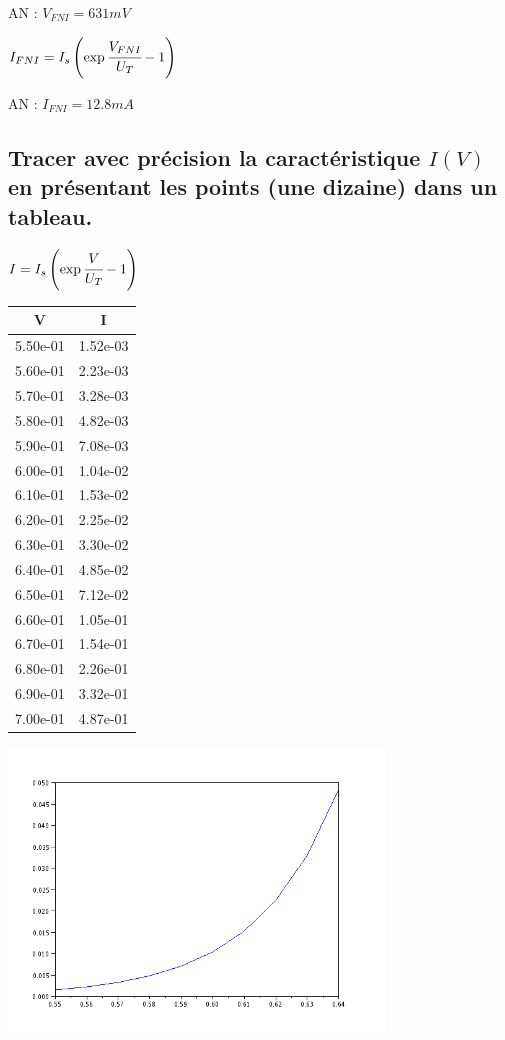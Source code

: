 \documentclass[10pt]{article}
\begin{document}
   AN : $V_{FNI} = 631mV$

   $I_{FNI}=I_s \left(\exp\cfrac{V_{FNI}}{U_T} -1\right)$

   AN : $I_{FNI} = 12.8mA$

  \subsection{Tracer avec précision la caractéristique $I(V)$ en présentant les points (une dizaine) dans un tableau.}
   $I = I_s\left(\exp{\cfrac{V}{U_T}}-1\right)$
   \begin{multicols}{2}
    \begin{tabular}{|c|c|}
     \hline
     V    &    I  \\
     \hline
     5.50e-01 & 1.52e-03\\
     \hline
     5.60e-01 & 2.23e-03\\
     \hline
     5.70e-01 & 3.28e-03\\
     \hline
     5.80e-01 & 4.82e-03\\
     \hline
     5.90e-01 & 7.08e-03\\
     \hline
     6.00e-01 & 1.04e-02\\
     \hline
     6.10e-01 & 1.53e-02\\
     \hline
     6.20e-01 & 2.25e-02\\
     \hline
     6.30e-01 & 3.30e-02\\
     \hline
     6.40e-01 & 4.85e-02\\
     \hline
     6.50e-01 & 7.12e-02\\
     \hline
     6.60e-01 & 1.05e-01\\
     \hline
     6.70e-01 & 1.54e-01\\
     \hline
     6.80e-01 & 2.26e-01\\
     \hline
     6.90e-01 & 3.32e-01\\
     \hline
     7.00e-01 & 4.87e-01\\
     \hline
    \end{tabular}
    \begin{center}\includegraphics[width=10cm]{II-2.png} \end{center} 
   \end{multicols}
  
\end{document}
